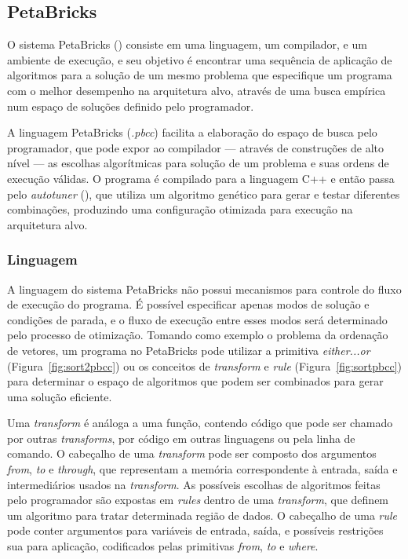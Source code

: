 \documentclass[a4paper, 11pt]{article}
\begin{document}
\subsection{PetaBricks} \label{sec:peta}

O sistema PetaBricks (\citet{ansel2009petabricks, ansel2014phd, 
ansel:xrds:2010, mitcsail-tr:2014})
consiste em uma linguagem, um compilador, e um ambiente de execução,
e seu objetivo é encontrar uma sequência de aplicação de algoritmos 
para a solução de um mesmo problema que especifique um programa com o melhor 
desempenho na arquitetura alvo, através de uma busca empírica num espaço
de soluções definido pelo programador.

A linguagem PetaBricks (\emph{.pbcc}) facilita a 
elaboração do espaço de busca pelo programador, que pode expor ao compilador 
--- através de construções de alto nível --- as escolhas algorítmicas 
para solução de um problema e suas ordens de execução válidas. O programa é 
compilado para a linguagem C++ e então passa pelo \emph{autotuner} 
(\citet{ansel2011efficient}), que utiliza um algoritmo genético para gerar e 
testar diferentes combinações, produzindo uma configuração otimizada para 
execução na arquitetura alvo.

\subsubsection{Linguagem}

A linguagem do sistema PetaBricks não possui mecanismos para controle do fluxo
de execução do programa. É possível especificar apenas modos de solução e 
condições de parada, e o fluxo de execução entre esses modos será determinado 
pelo processo de otimização.
Tomando como exemplo o problema da ordenação de vetores, um programa no
PetaBricks pode utilizar a primitiva \emph{either...or} 
(Figura~\ref{fig:sort2pbcc}) ou os conceitos de \emph{transform} e \emph{rule}
(Figura~\ref{fig:sortpbcc}) para determinar o espaço de algoritmos que podem 
ser combinados para gerar uma solução eficiente.

Uma \emph{transform} é análoga a uma função, contendo código que pode
ser chamado por outras \emph{transforms}, por código em outras linguagens
ou pela linha de comando. O cabeçalho de uma \emph{transform} pode ser composto
dos argumentos \emph{from}, \emph{to} e \emph{through}, que representam a
memória correspondente à entrada, saída e intermediários usados na 
\emph{transform}.
As possíveis escolhas de algoritmos feitas pelo programador são expostas 
em \emph{rules} dentro de uma \emph{transform}, que definem um algoritmo
para tratar determinada região de dados. O cabeçalho de uma \emph{rule} pode
conter argumentos para variáveis de entrada, saída, e possíveis restrições sua 
para aplicação, codificados pelas primitivas \emph{from}, \emph{to} e 
\emph{where}.
\end{document}
